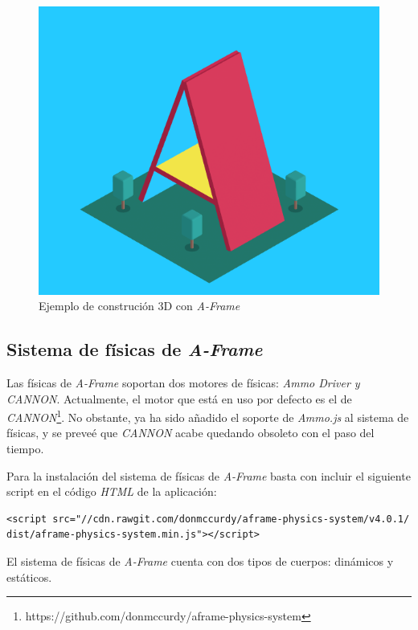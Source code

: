 \begin{figure}[h!]
    \centering
    \includegraphics[scale=0.75]{a-frame.PNG} 
    \caption{Ejemplo de construción 3D con \textit{A-Frame} \footnotemark}
    \label{fig:a-frame}
\end{figure}

\subsection{Sistema de físicas de \textit{A-Frame}}
Las físicas de \textit{A-Frame} soportan dos motores de físicas: \textit{Ammo Driver y CANNON}. Actualmente, el motor que está en uso por defecto es el de \textit{CANNON}\footnote{https://github.com/donmccurdy/aframe-physics-system}. No obstante, ya ha sido añadido el soporte de \textit{Ammo.js} al sistema de físicas, y se preveé que \textit{CANNON} acabe quedando obsoleto con el paso del tiempo. \newline

Para la instalación del sistema de físicas de \textit{A-Frame} basta con incluir el siguiente script en el código \textit{HTML} de la aplicación: 

\begin{verbatim}
<script src="//cdn.rawgit.com/donmccurdy/aframe-physics-system/v4.0.1/  
dist/aframe-physics-system.min.js"></script>
\end{verbatim}

El sistema de físicas de \textit{A-Frame} cuenta con dos tipos de cuerpos: dinámicos y estáticos.

